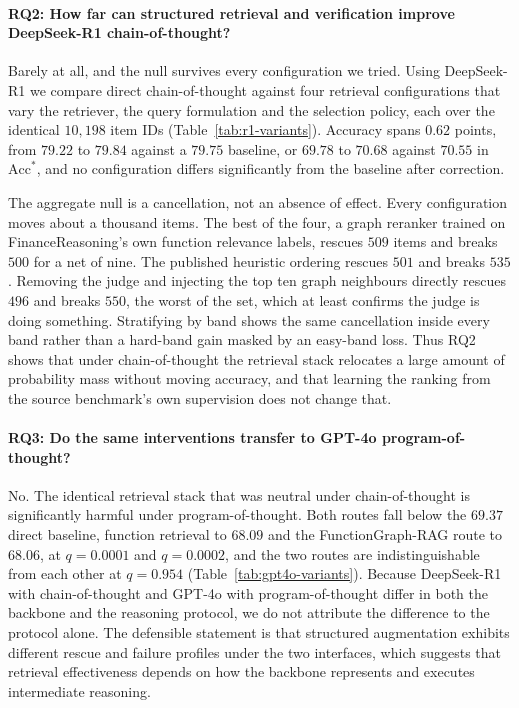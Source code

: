\paragraph{RQ2: How far can structured retrieval and verification improve DeepSeek-R1
chain-of-thought?}
Barely at all, and the null survives every configuration we tried. Using DeepSeek-R1 we compare
direct chain-of-thought against four retrieval configurations that vary the retriever, the query
formulation and the selection policy, each over the identical $10{,}198$ item IDs
(Table~\ref{tab:r1-variants}). Accuracy spans $0.62$ points, from $79.22$ to $79.84$ against a
$79.75$ baseline, or $69.78$ to $70.68$ against $70.55$ in $\mathrm{Acc}^{*}$, and no
configuration differs significantly from the baseline after correction.

The aggregate null is a cancellation, not an absence of effect. Every configuration moves about
a thousand items. The best of the four, a graph reranker trained on FinanceReasoning's own
function relevance labels, rescues $509$ items and breaks $500$ for a net of nine. The published
heuristic ordering rescues $501$ and breaks $535$. Removing the judge and injecting the top ten
graph neighbours directly rescues $496$ and breaks $550$, the worst of the set, which at least
confirms the judge is doing something. Stratifying by band shows the same cancellation inside
every band rather than a hard-band gain masked by an easy-band loss. Thus RQ2 shows that under
chain-of-thought the retrieval stack relocates a large amount of probability mass without moving
accuracy, and that learning the ranking from the source benchmark's own supervision does not
change that.

\paragraph{RQ3: Do the same interventions transfer to GPT-4o program-of-thought?}
No. The identical retrieval stack that was neutral under chain-of-thought is significantly
harmful under program-of-thought. Both routes fall below the $69.37$ direct baseline, function
retrieval to $68.09$ and the FunctionGraph-RAG route to $68.06$, at $q=0.0001$ and $q=0.0002$, and
the two routes are indistinguishable from each other at $q=0.954$
(Table~\ref{tab:gpt4o-variants}). Because DeepSeek-R1 with chain-of-thought and GPT-4o with
program-of-thought differ in both the backbone and the reasoning protocol, we do not attribute
the difference to the protocol alone. The defensible statement is that structured augmentation
exhibits different rescue and failure profiles under the two interfaces, which suggests that
retrieval effectiveness depends on how the backbone represents and executes intermediate
reasoning.

